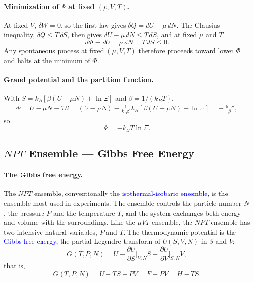 \paragraph{Minimization of $\Phi$ at fixed $(\mu,V,T)$.}
At fixed $V$, $\delta W=0$, so the first law gives $\delta Q=dU-\mu\,dN$.
The Clausius inequality, $\delta Q\leq T\,dS$, then gives
$dU-\mu\,dN\leq T\,dS$, and at fixed $\mu$ and $T$
\begin{equation}
    \boxed{d\Phi=dU-\mu\,dN-T\,dS\leq0.}
\end{equation}
Any spontaneous process at fixed $(\mu,V,T)$ therefore proceeds toward lower
$\Phi$ and halts at the minimum of $\Phi$.

\paragraph{Grand potential and the partition function.}
With $S=k_B[\beta(U-\mu N)+\ln\Xi]$ and $\beta=1/(k_BT)$,
\begin{align*}
    \Phi=U-\mu N-TS
    =(U-\mu N)-\frac{1}{k_B\beta}\,k_B\left[\beta(U-\mu N)+\ln\Xi\right]
    =-\frac{\ln\Xi}{\beta},
\end{align*}
so
\begin{equation}
    \boxed{\Phi=-k_BT\ln\Xi.}
\end{equation}

\subsection{$NPT$ Ensemble --- Gibbs Free Energy}

\paragraph{The Gibbs free energy.}
The $NPT$ ensemble, conventionally the \textcolor{blue}{isothermal-isobaric
ensemble}, is the ensemble most used in experiments. The ensemble controls
the particle number $N$, the pressure $P$ and the temperature $T$, and the
system exchanges both energy and volume with the surroundings. Like the
$\mu VT$ ensemble, the $NPT$ ensemble has two intensive natural variables,
$P$ and $T$. The thermodynamic potential is the \textcolor{blue}{Gibbs free
energy}, the partial Legendre transform of $U(S,V,N)$ in $S$ and $V$:
\begin{equation*}
    G(T,P,N)=U-\frac{\partial U}{\partial S}\bigg|_{V,N}S
    -\frac{\partial U}{\partial V}\bigg|_{S,N}V,
\end{equation*}
that is,
\begin{equation}
    \boxed{G(T,P,N)=U-TS+PV=F+PV=H-TS.}
\end{equation}

